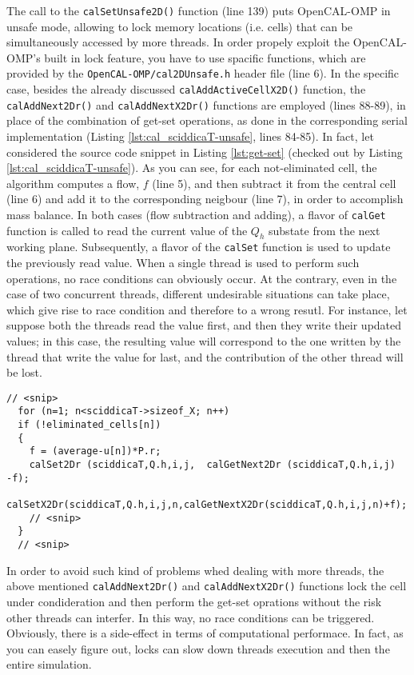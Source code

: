 The call to the \verb'calSetUnsafe2D()' function (line 139) puts
OpenCAL-OMP in unsafe mode, allowing to lock memory locations
(i.e. cells) that can be simultaneously accessed by more threads. In
order propely exploit the OpenCAL-OMP's built in lock feature, you
have to use spacific functions, which are provided by the
\verb'OpenCAL-OMP/cal2DUnsafe.h' header file (line 6). In the specific
case, besides the already discussed \verb'calAddActiveCellX2D()'
function, the \verb'calAddNext2Dr()' and \verb'calAddNextX2Dr()'
functions are employed (lines 88-89), in place of the combination of
get-set operations, as done in the corresponding serial implementation
(Listing \ref{lst:cal_sciddicaT-unsafe}, lines 84-85). In fact, let
considered the source code snippet in Listing \ref{lst:get-set}
(checked out by Listing \ref{lst:cal_sciddicaT-unsafe}). As you can
see, for each not-eliminated cell, the algorithm computes a flow, $f$
(line 5), and then subtract it from the central cell (line 6) and add
it to the corresponding neigbour (line 7), in order to accomplish mass
balance. In both cases (flow subtraction and adding), a flavor of
\verb'calGet' function is called to read the current value of the
$Q_h$ substate from the next working plane. Subsequently, a flavor of
the \verb'calSet' function is used to update the previously read
value. When a single thread is used to perform such operations, no
race conditions can obviously occur. At the contrary, even in the case
of two concurrent threads, different undesirable situations can take
place, which give rise to race condition and therefore to a wrong
resutl. For instance, let suppose both the threads read the value
first, and then they write their updated values; in this case, the
resulting value will correspond to the one written by the thread that
write the value for last, and the contribution of the other thread
will be lost.

\begin{lstlisting}[float,floatplacement=H, label=lst:get-set, caption=Example of non atomic operation made of a combination of get-set calls.]
  // <snip>
  for (n=1; n<sciddicaT->sizeof_X; n++)
  if (!eliminated_cells[n])
  {
    f = (average-u[n])*P.r;
    calSet2Dr (sciddicaT,Q.h,i,j,  calGetNext2Dr (sciddicaT,Q.h,i,j)  -f);
    calSetX2Dr(sciddicaT,Q.h,i,j,n,calGetNextX2Dr(sciddicaT,Q.h,i,j,n)+f);
    // <snip>
  }
  // <snip>
\end{lstlisting}  

In order to avoid such kind of problems whed dealing with more
threads, the above mentioned \verb'calAddNext2Dr()' and
\verb'calAddNextX2Dr()' functions lock the cell under condideration
and then perform the get-set oprations without the risk other threads
can interfer. In this way, no race conditions can be
triggered. Obviously, there is a side-effect in terms of computational
performace. In fact, as you can easely figure out, locks can slow down
threads execution and then the entire simulation.


